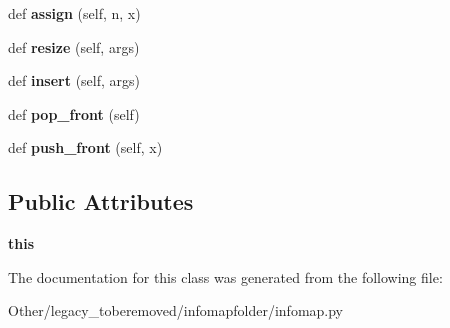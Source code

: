 \begin{DoxyCompactItemize}
def {\bfseries assign} (self, n, x)
\item 
\mbox{\label{classinfomapfolder_1_1infomap_1_1UIntDeque_a47186ce747ea2e3dca5b0eb3aa6eccf1}} 
def {\bfseries resize} (self, args)
\item 
\mbox{\label{classinfomapfolder_1_1infomap_1_1UIntDeque_a45bd3e66c782b6468fd70837af942377}} 
def {\bfseries insert} (self, args)
\item 
\mbox{\label{classinfomapfolder_1_1infomap_1_1UIntDeque_a98880087f090870bc1c71ef8ebe9ee1b}} 
def {\bfseries pop\+\_\+front} (self)
\item 
\mbox{\label{classinfomapfolder_1_1infomap_1_1UIntDeque_a054a57c9162a5e27eaaab83d2289f9da}} 
def {\bfseries push\+\_\+front} (self, x)
\end{DoxyCompactItemize}
\subsection*{Public Attributes}
\begin{DoxyCompactItemize}
\item 
\mbox{\label{classinfomapfolder_1_1infomap_1_1UIntDeque_a99c2f6e40566dd1ffad07841f86f344c}} 
{\bfseries this}
\end{DoxyCompactItemize}


The documentation for this class was generated from the following file\+:\begin{DoxyCompactItemize}
\item 
Other/legacy\+\_\+toberemoved/infomapfolder/infomap.\+py\end{DoxyCompactItemize}
